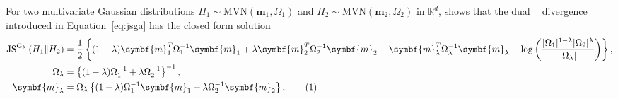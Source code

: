 \documentclass[
  12pt]{article}
\DeclarePairedDelimiter\abs{\lvert}{\rvert}%
\newcommand{\JSGa}{\mathop{\mathrm{JS}^{\mathrm{G}_{\lambda}}}\nolimits}
\newcommand\numberthis{\addtocounter{equation}{1}\tag{\theequation}}
\begin{document}
For two multivariate Gaussian distributions $H_1 \sim \mbox{MVN}(\symbf{m}_1, \Omega_1)$ and $H_2 \sim \mbox{MVN}(\symbf{m}_2, \Omega_2)$ in $\mathbb{R}^d$, \citet{Nielsen2019} shows that the dual $\JSGa{}$ divergence introduced in Equation~\eqref{eq:jsga} has the closed form solution 
\begin{align*}%
  \JSGa{}(H_1 \Vert H_2) &= \frac{1}{2} \left\{ (1-\lambda) \symbf{m}_1^T \Omega_1^{-1} \symbf{m}_1 + \lambda \symbf{m}_2^T \Omega_2^{-1} \symbf{m}_2 - \symbf{m}_{\lambda}^T \Omega_{\lambda}^{-1} \symbf{m}_{\lambda} + \log{\left( \frac{\abs{\Omega_1}^{1-\lambda} \abs{\Omega_2}^{\lambda}}{\abs{\Omega_{\lambda}}} \right)} \right\}, \\
  \Omega_{\lambda} &= \left\{ (1-\lambda) \Omega_1^{-1} + \lambda \Omega_2^{-1} \right\}^{-1}, \\
  \symbf{m}_{\lambda} &= \Omega_{\lambda} \left\{(1-\lambda) \Omega_1^{-1} \symbf{m}_1 + \lambda \Omega_2^{-1} \symbf{m}_2 \right\}, \numberthis~\label{eq:js_norm_mvn1}
\end{align*} 
\end{document}
